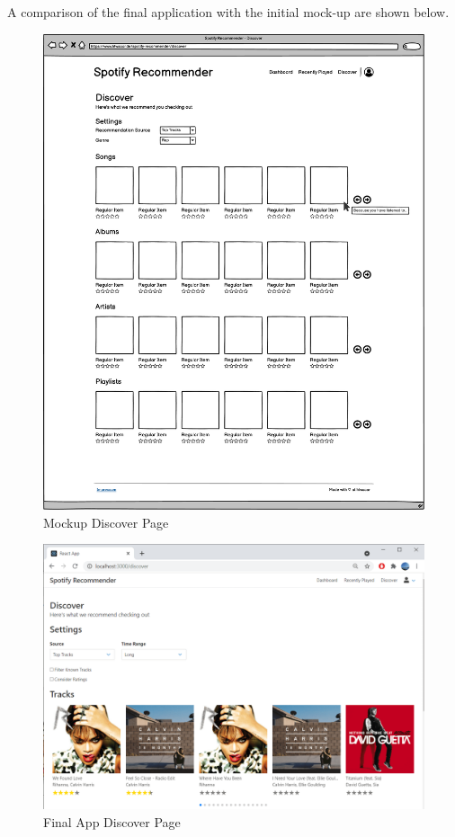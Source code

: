 A comparison of the final application with the initial mock-up are shown below.

\begin{figure}[bth]
    \centering
    \includegraphics[width=1.0\textwidth]{Graphics/Chapter1/MockupDiscoverPage.pdf}
    \caption{Mockup Discover Page}
\end{figure}

\begin{figure}[bth]
    \centering
    \includegraphics[width=1.0\textwidth]{Graphics/Chapter1/AppDiscoverPage.png}
    \caption{Final App Discover Page}
\end{figure}

